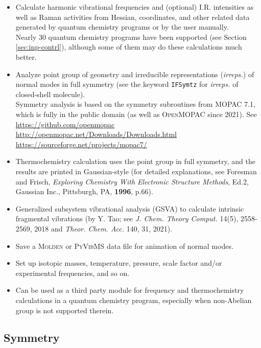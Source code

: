 \documentclass[12pt,english]{extarticle}
\begin{document}
\begin{itemize}
\item Calculate harmonic vibrational frequencies and (optional) I.R. intensities as well as Raman activities from Hessian, coordinates, and other related data generated by quantum chemistry programs or by the user manually. \\
    Nearly 30 quantum chemistry programs have been supported (see Section \ref{sec:inp-contrl}), although some of them may do these calculations much better.
\item Analyze point group of geometry and irreducible representations (\emph{irreps.}) of normal modes in full symmetry (see the keyword \verb|IFSymtz| for \emph{irreps.} of closed-shell molecule). \\
    Symmetry analysis is based on the symmetry subroutines from \textsc{MOPAC} 7.1, which is fully in the public domain (as well as \textsc{OpenMOPAC} since 2021). See \\
    \url{https://github.com/openmopac} \\
    \url{http://openmopac.net/Downloads/Downloads.html} \\
    \url{https://sourceforge.net/projects/mopac7/}
\item Thermochemistry calculation uses the point group in full symmetry, and the results are printed in Gaussian-style (for detailed explanations, see Foresman and Frisch, \emph{Exploring Chemistry With Electronic Structure Methods}, Ed.2, Gaussian Inc., Pittsburgh, PA, \textbf{1996}, p.66).
\item Generalized subsystem vibrational analysis (GSVA) to calculate intrinsic fragmental vibrations (by Y. Tao; see \textit{J. Chem. Theory Comput.} 14(5), 2558-2569, 2018 and \textit{Theor. Chem. Acc.} 140, 31, 2021).
\item Save a \textsc{Molden} or \textsc{PyVibMS} data file for animation of normal modes.
\item Set up isotopic masses, temperature, pressure, scale factor and/or experimental frequencies, and so on.
\item Can be used as a third party module for frequency and thermochemistry calculations in a quantum chemistry program, especially when non-Abelian group is not supported therein.
\end{itemize}

\subsection{Symmetry} \label{sec:symm}
\end{document}
